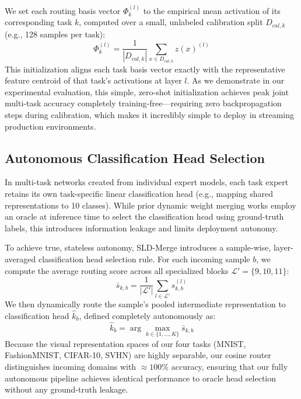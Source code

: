 We set each routing basis vector $\Phi_k^{(l)}$ to the empirical mean activation of its corresponding task $k$, computed over a small, unlabeled calibration split $D_{cal, k}$ (e.g., 128 samples per task):
\begin{equation}
    \Phi_k^{(l)} = \frac{1}{|D_{cal, k}|} \sum_{x \in D_{cal, k}} z(x)^{(l)}
\end{equation}
This initialization aligns each task basis vector exactly with the representative feature centroid of that task's activations at layer $l$. 
As we demonstrate in our experimental evaluation, this simple, zero-shot initialization achieves peak joint multi-task accuracy completely training-free—requiring zero backpropagation steps during calibration, which makes it incredibly simple to deploy in streaming production environments.

\subsection{Autonomous Classification Head Selection}
In multi-task networks created from individual expert models, each task expert retains its own task-specific linear classification head (e.g., mapping shared representations to 10 classes). While prior dynamic weight merging works employ an oracle at inference time to select the classification head using ground-truth labels, this introduces information leakage and limits deployment autonomy. 

To achieve true, stateless autonomy, SLD-Merge introduces a sample-wise, layer-averaged classification head selection rule. For each incoming sample $b$, we compute the average routing score across all specialized blocks $\mathcal{L}' = \{9, 10, 11\}$:
\begin{equation}
    \bar{s}_{k,b} = \frac{1}{|\mathcal{L}'|} \sum_{l \in \mathcal{L}'} s_{k,b}^{(l)}
\end{equation}
We then dynamically route the sample's pooled intermediate representation to classification head $\hat{k}_b$, defined completely autonomously as:
\begin{equation}
    \hat{k}_b = \arg\max_{k \in \{1, \dots, K\}} \bar{s}_{k,b}
\end{equation}
Because the visual representation spaces of our four tasks (MNIST, FashionMNIST, CIFAR-10, SVHN) are highly separable, our cosine router distinguishes incoming domains with $\approx 100\%$ accuracy, ensuring that our fully autonomous pipeline achieves identical performance to oracle head selection without any ground-truth leakage.
